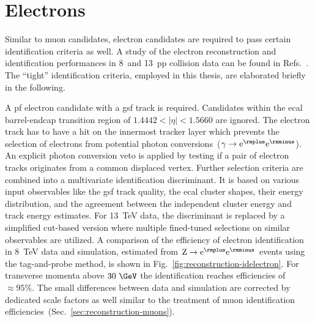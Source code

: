 \section{Electrons}
\label{sec:reconstruction-electrons}

Similar to muon candidates, electron candidates are required to pass certain identification criteria as well. A study of the electron reconstruction and identification performances in 8~\TeV and 13~\TeV \gls{pp} collision data can be found in Refs.~\cite{Khachatryan:2015hwa,CMS-DP-2017-004}. The ``tight'' identification criteria, employed in this thesis, are elaborated briefly in the following.

A \gls{pf} electron candidate with a \gls{gsf} track is required. Candidates within the \gls{ecal} barrel-endcap transition region of $1.4442<|\eta|<1.5660$ are ignored. The electron track has to have a hit on the innermost tracker layer which prevents the selection of electrons from potential photon conversions~($\gamma\to\mathrm{e}^{\rmplus}\mathrm{e}^{\rmminus}$). An explicit photon conversion veto is applied by testing if a pair of electron tracks originates from a common displaced vertex. Further selection criteria are combined into a multivariate identification discriminant. It is based on various input observables like the \gls{gsf} track quality, the \gls{ecal} cluster shapes, their energy distribution, and the agreement between the independent cluster energy and track energy estimates. For 13~TeV data, the discriminant is replaced by a simplified cut-based version where multiple fined-tuned selections on similar observables are utilized. A comparison of the efficiency of electron identification in 8~TeV data and simulation, estimated from $\mathrm{Z}\to\mathrm{e}^{\rmplus}\mathrm{e}^{\rmminus}$ events using the tag-and-probe method, is shown in Fig.~\ref{fig:reconstruction-idelectron}. For transverse momenta above $30~\GeV$ the identification reaches efficiencies of $\approx95\%$. The small differences between data and simulation are corrected by dedicated scale factors as well similar to the treatment of muon identification efficiencies~(Sec.~\ref{sec:reconstruction-muons}).


